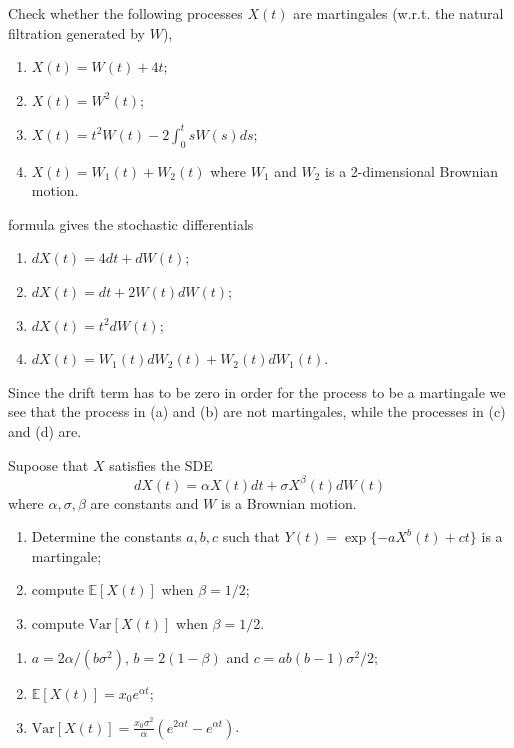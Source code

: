 \documentclass[12pt,a4paper]{exam}
\begin{document}
\begin{questions}
\begin{solution}
\begin{solution}
\question Check whether the following processes $X(t)$ are martingales (w.r.t. the natural filtration generated by $W$),
\begin{enumerate}[label=(\alph*),font=\itshape]
\item $X(t) = W(t) + 4t$;
\item $X(t) = W^2(t)$;
\item $X(t) = t^2W(t) - 2\int_0^tsW(s)ds$;
\item $X(t) = W_1(t) + W_2(t)$ where $W_1$ and $W_2$ is a 2-dimensional Brownian motion.
\end{enumerate}
\fillwithlines{3cm}

\begin{solution}
\ito formula gives the stochastic differentials 
\begin{enumerate}[label=(\alph*),font=\itshape]
\item $dX(t) = 4dt + dW(t) $;
\item $dX(t) = dt+2W(t)dW(t)$;
\item $dX(t) = t^2dW(t)$;
\item $dX(t) = W_1(t)dW_2(t) + W_2(t)dW_1(t)$.
\end{enumerate}
Since the drift term has to be zero in order for the process to be a martingale we see that the process in (a) and (b) are not martingales, while the processes in (c) and (d) are.
\end{solution}

\question Supoose that $X$ satisfies the SDE
\begin{equation*}
dX(t) = \alpha X(t)dt + \sigma X^{\beta}(t)dW(t)
\end{equation*}
where $\alpha, \sigma, \beta$ are constants and $W$ is a Brownian motion.
\begin{enumerate}[label=(\alph*),font=\itshape]
\item Determine the constants $a, b, c$ such that $Y(t) = \exp\{-a X^b(t) + ct\}$ is a martingale;
\item compute $\mathbb{E}[X(t)]$ when $\beta =1/2$;
\item compute $\text{Var}[X(t)]$ when $\beta =1/2$.
\end{enumerate}
\fillwithlines{3cm}

\begin{solution}
\begin{enumerate}[label=(\alph*),font=\itshape]
\item $a=2\alpha/(b\sigma^2)$, $b=2(1-\beta)$ and $c=ab(b-1)\sigma^2/2$;
\item $\mathbb{E}[X(t)] = x_0e^{\alpha t}$;
\item $\text{Var}[X(t)] = \frac{x_0\sigma^2}{\alpha}(e^{2\alpha t}-e^{\alpha t})$.
\end{enumerate}
\end{solution}


\end{solution}
\end{solution}
\end{questions}
\end{document}
